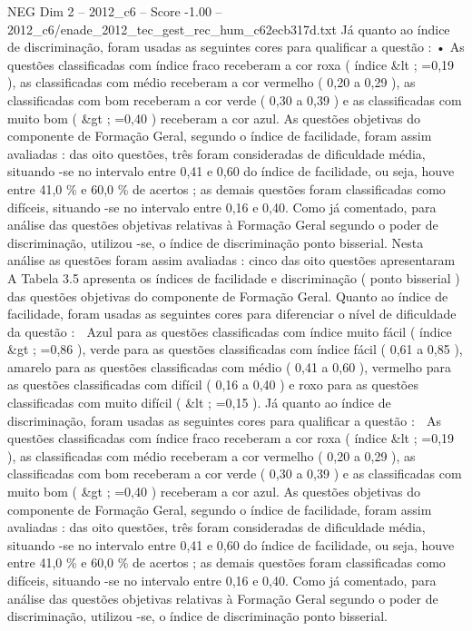 \begin{textsample}{NEG Dim 2 – 2012\_c6 – Score -1.00 – 2012\_c6/enade\_2012\_tec\_gest\_rec\_hum\_c62ecb317d.txt}
Já quanto ao índice de discriminação, foram usadas as seguintes cores para qualificar a questão : • As questões classificadas com índice fraco receberam a cor roxa ( índice \&lt ; =0,19 ), as classificadas com médio receberam a cor vermelho ( 0,20 a 0,29 ), as classificadas com bom receberam a cor verde ( 0,30 a 0,39 ) e as classificadas com muito bom ( \&gt ; =0,40 ) receberam a cor azul.
As questões objetivas do componente de Formação Geral, segundo o índice de facilidade, foram assim avaliadas : das oito questões, três foram consideradas de dificuldade média, situando -se no intervalo entre 0,41 e 0,60 do índice de facilidade, ou seja, houve entre 41,0 \% e 60,0 \% de acertos ; as demais questões foram classificadas como difíceis, situando -se no intervalo entre 0,16 e 0,40.
Como já comentado, para análise das questões objetivas relativas à Formação Geral segundo o poder de discriminação, utilizou -se, o índice de discriminação ponto bisserial.
Nesta análise as questões foram assim avaliadas : cinco das oito questões apresentaram A Tabela 3.5 apresenta os índices de facilidade e discriminação ( ponto bisserial ) das questões objetivas do componente de Formação Geral.
Quanto ao índice de facilidade, foram usadas as seguintes cores para diferenciar o nível de dificuldade da questão :  Azul para as questões classificadas com índice muito fácil ( índice \&gt ; =0,86 ), verde para as questões classificadas com índice fácil ( 0,61 a 0,85 ), amarelo para as questões classificadas com médio ( 0,41 a 0,60 ), vermelho para as questões classificadas com difícil ( 0,16 a 0,40 ) e roxo para as questões classificadas com muito difícil ( \&lt ; =0,15 ).
Já quanto ao índice de discriminação, foram usadas as seguintes cores para qualificar a questão :  As questões classificadas com índice fraco receberam a cor roxa ( índice \&lt ; =0,19 ), as classificadas com médio receberam a cor vermelho ( 0,20 a 0,29 ), as classificadas com bom receberam a cor verde ( 0,30 a 0,39 ) e as classificadas com muito bom ( \&gt ; =0,40 ) receberam a cor azul.
As questões objetivas do componente de Formação Geral, segundo o índice de facilidade, foram assim avaliadas : das oito questões, três foram consideradas de dificuldade média, situando -se no intervalo entre 0,41 e 0,60 do índice de facilidade, ou seja, houve entre 41,0 \% e 60,0 \% de acertos ; as demais questões foram classificadas como difíceis, situando -se no intervalo entre 0,16 e 0,40.
Como já comentado, para análise das questões objetivas relativas à Formação Geral segundo o poder de discriminação, utilizou -se, o índice de discriminação ponto bisserial.

\end{textsample}
